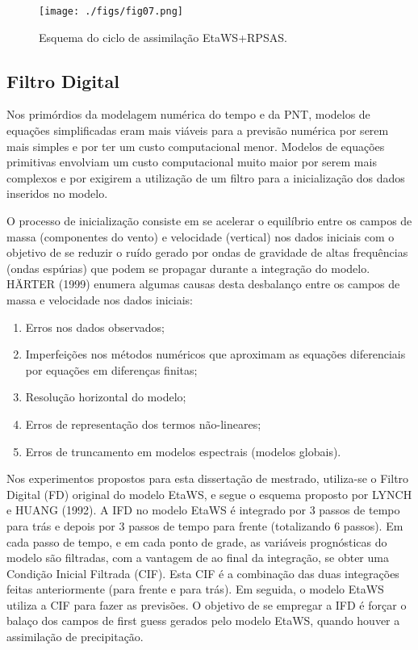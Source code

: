 \begin{figure}
	\centering
		\texttt{[image: ./figs/fig07.png]}
	  \caption{Esquema do ciclo de assimilação EtaWS+RPSAS.}
	 \label{fig07}
\end{figure}

\subsection{Filtro Digital}

Nos primórdios da modelagem numérica do tempo e da PNT, modelos de equações simplificadas eram mais viáveis para a previsão numérica por serem mais simples e por ter um custo computacional menor. Modelos de equações primitivas envolviam um custo computacional muito maior por serem mais complexos e por exigirem a utilização de um filtro para a inicialização dos dados inseridos no modelo. 

O processo de inicialização consiste em se acelerar o equilíbrio entre os campos de massa (componentes do vento) e velocidade (vertical) nos dados iniciais com o objetivo de se reduzir o ruído gerado por ondas de gravidade de altas frequências (ondas espúrias) que podem se propagar durante a integração do modelo. H\"{A}RTER (1999) enumera algumas causas desta desbalanço entre os campos de massa e velocidade nos dados iniciais:

\begin{enumerate}
\item Erros nos dados observados;
\item Imperfeições nos métodos numéricos que aproximam as equações diferenciais por equações em diferenças finitas;
\item Resolução horizontal do modelo;
\item Erros de representação dos termos não-lineares;
\item Erros de truncamento em modelos espectrais (modelos globais).
\end{enumerate}

Nos experimentos propostos para esta dissertação de mestrado, utiliza-se o Filtro Digital (FD) original do modelo EtaWS, e segue o esquema proposto por LYNCH e HUANG (1992). A IFD no modelo EtaWS é integrado por 3 passos de tempo para trás e depois por 3 passos de tempo para frente (totalizando 6 passos). Em cada passo de tempo, e em cada ponto de grade, as variáveis prognósticas do modelo são filtradas, com a vantagem de ao final da integração, se obter uma Condição Inicial Filtrada (CIF). Esta CIF é a combinação das duas integrações feitas anteriormente (para frente e para trás). Em seguida, o modelo EtaWS utiliza a CIF para fazer as previsões. O objetivo de se empregar a IFD é forçar o balaço dos campos de first guess gerados pelo modelo EtaWS, quando houver a assimilação de precipitação.

